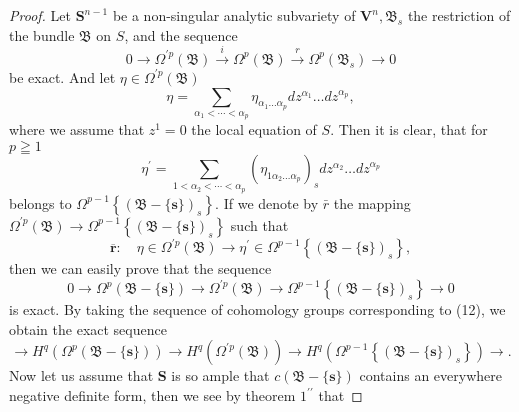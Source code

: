 \documentclass[lang=en,12pt]{beautybook}
\begin{document}
\begin{proof}
Let $\boldsymbol{S}^{n-1}$ be a non-singular analytic subvariety of $\boldsymbol{V}^n, \mathfrak{B}_s$ the restriction of the bundle $\mathfrak{B}$ on $S$, and the sequence
\begin{equation*}
0 \rightarrow \Omega^{\prime p}(\mathfrak{B}) \stackrel{i}{\rightarrow} \Omega^p(\mathfrak{B}) \stackrel{r}{\rightarrow} \Omega^p\left(\mathfrak{B}_s\right) \rightarrow 0
\end{equation*}
be exact. And let $\eta \in \Omega^{\prime p}(\mathfrak{B})$
\begin{equation*}
\eta=\sum_{\alpha_1<\cdots<\alpha_p} \eta_{\alpha_1 \ldots \alpha_p} d z^{\alpha_1} \ldots d z^{\alpha_p},
\end{equation*}
where we assume that $z^1=0$ the local equation of $S$. Then it is clear, that for $p \geqq 1$
\begin{equation*}
\eta^{\prime}=\sum_{1<\alpha_2<\cdots<\alpha_p}\left(\eta_{1 \alpha_2 \ldots \alpha_p}\right)_s d z^{\alpha_2} \ldots d z^{\alpha_p}
\end{equation*}
belongs to $\Omega^{p-1}\left\{(\mathfrak{B}-\{\boldsymbol{s}\})_s\right\}$. If we denote by $\bar{r}$ the mapping $\Omega^{\prime p}(\mathfrak{B})\rightarrow \Omega^{p-1}\left\{(\mathfrak{B}-\{\boldsymbol{s}\})_s\right\}$ such that
\begin{equation*}
\overline{\boldsymbol{r}}: \quad \eta \in \Omega^{\prime p}(\mathfrak{B}) \rightarrow \eta^{\prime} \in \Omega^{p-1}\left\{(\mathfrak{B}-\{\boldsymbol{s}\})_s\right\},
\end{equation*}
then we can easily prove that the sequence
\begin{equation*}
0 \rightarrow \Omega^p(\mathfrak{B}-\{\boldsymbol{s}\}) \rightarrow \Omega^{\prime p}(\mathfrak{B}) \rightarrow \Omega^{p-1}\left\{(\mathfrak{B}-\{\boldsymbol{s}\})_s\right\} \rightarrow 0
\end{equation*}
is exact. By taking the sequence of cohomology groups corresponding to (12), we obtain the exact sequence
\begin{equation*}
\rightarrow H^q\left(\Omega^p(\mathfrak{B}-\{\boldsymbol{s}\})\right) \rightarrow H^q\left(\Omega^{\prime p}(\mathfrak{B})\right) \rightarrow H^q\left(\Omega^{p-1}\left\{(\mathfrak{B}-\{\boldsymbol{s}\})_s\right\}\right) \rightarrow .
\end{equation*}
Now let us assume that $\boldsymbol{S}$ is so ample that $c(\mathfrak{B}-\{\boldsymbol{s}\})$ contains an everywhere negative definite form, then we see by theorem $1^{\prime \prime}$ that

\end{proof}
\end{document}
